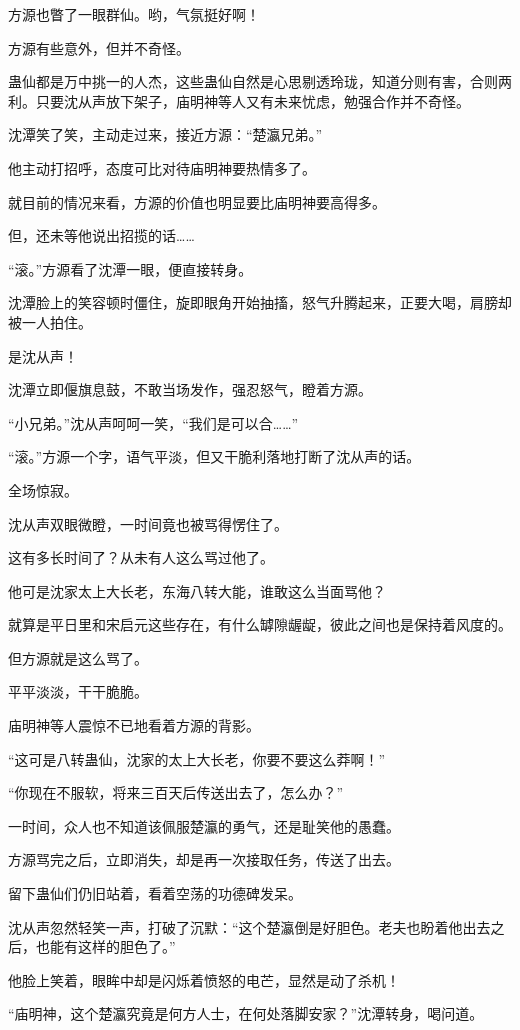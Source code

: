 \begin{this_body}
方源也瞥了一眼群仙。哟，气氛挺好啊！

方源有些意外，但并不奇怪。

蛊仙都是万中挑一的人杰，这些蛊仙自然是心思剔透玲珑，知道分则有害，合则两利。只要沈从声放下架子，庙明神等人又有未来忧虑，勉强合作并不奇怪。

沈潭笑了笑，主动走过来，接近方源：“楚瀛兄弟。”

他主动打招呼，态度可比对待庙明神要热情多了。

就目前的情况来看，方源的价值也明显要比庙明神要高得多。

但，还未等他说出招揽的话……

“滚。”方源看了沈潭一眼，便直接转身。

沈潭脸上的笑容顿时僵住，旋即眼角开始抽搐，怒气升腾起来，正要大喝，肩膀却被一人拍住。

是沈从声！

沈潭立即偃旗息鼓，不敢当场发作，强忍怒气，瞪着方源。

“小兄弟。”沈从声呵呵一笑，“我们是可以合……”

“滚。”方源一个字，语气平淡，但又干脆利落地打断了沈从声的话。

全场惊寂。

沈从声双眼微瞪，一时间竟也被骂得愣住了。

这有多长时间了？从未有人这么骂过他了。

他可是沈家太上大长老，东海八转大能，谁敢这么当面骂他？

就算是平日里和宋启元这些存在，有什么罅隙龌龊，彼此之间也是保持着风度的。

但方源就是这么骂了。

平平淡淡，干干脆脆。

庙明神等人震惊不已地看着方源的背影。

“这可是八转蛊仙，沈家的太上大长老，你要不要这么莽啊！”

“你现在不服软，将来三百天后传送出去了，怎么办？”

一时间，众人也不知道该佩服楚瀛的勇气，还是耻笑他的愚蠢。

方源骂完之后，立即消失，却是再一次接取任务，传送了出去。

留下蛊仙们仍旧站着，看着空荡的功德碑发呆。

沈从声忽然轻笑一声，打破了沉默：“这个楚瀛倒是好胆色。老夫也盼着他出去之后，也能有这样的胆色了。”

他脸上笑着，眼眸中却是闪烁着愤怒的电芒，显然是动了杀机！

“庙明神，这个楚瀛究竟是何方人士，在何处落脚安家？”沈潭转身，喝问道。


\end{this_body}
